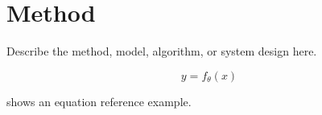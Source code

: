 \section{Method}

Describe the method, model, algorithm, or system design here.

\begin{equation}
  y = f_\theta(x)
  \label{eq:example}
\end{equation}

 shows an equation reference example.
